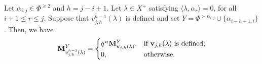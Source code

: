 \begin{lemma}\rm\label{lem: completar Q en caso h-1}
    Let  $\alpha_{i,j}\in \Phi^{\geq 2}$ and $h=j-i+1$.
    Let $\lambda\in X^{+}$ satisfying $\langle \lambda , \alpha_r \rangle  =0$, for all $i+1\leq r \leq j$.
    Suppose that $v^{h-1}_{j,h}(\lambda)$ is defined and set $Y= \Phi^{\succ \alpha_{i,j}} \cup \{ \alpha_{i-h+1,i}  \} $.
    Then, we have
\begin{equation}
    \mathbf{M}_{v^{h-1}_{j,h}(\lambda)}^{Y} =
    \begin{cases}
        q^{\varkappa}\mathbf{M}_{\mathbf{v}_{j,h}(\lambda)}^{Y}, & \mbox{if } \mathbf{v}_{j,h}(\lambda) \mbox{ is defined;} \\
        0, & \mbox{otherwise.}
    \end{cases}
\end{equation}
\end{lemma}




